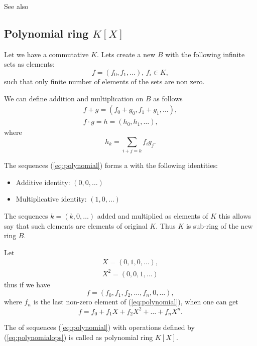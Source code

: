 \begin{appendices}
\begin{definition}
  See also 
  \label{def:quotientring}
\end{definition}

\subsection{Polynomial ring $K\left[X\right]$}

Let we have a commutative  $K$. Lets create a new
 $B$ with the following infinite sets as elements:
\begin{equation}
  f = \left(f_0, f_1, \dots \right), \, f_i \in K,
  \label{eq:polynomial}
\end{equation}
such that only finite number of elements of the sets are non zero.

We can define addition and multiplication on $B$ as follows
\begin{eqnarray}
  f + g = \left(f_0 + g_0, f_1 + g_1, \dots \right),
  \nonumber \\
  f \cdot g = h = \left(h_0, h_1, \dots \right),
  \label{eq:polynomialops}
\end{eqnarray}
where
\[
h_k = \sum_{i + j =k} f_i g_j. 
\]

The sequences (\ref{eq:polynomial}) forms a  with
the following identities:
\begin{itemize}
\item Additive identity: $\left(0, 0, \dots \right)$
\item Multiplicative identity: $\left(1, 0, \dots \right)$
\end{itemize}

The
sequences $k = \left(k, 0, \dots \right)$ added and multiplied as
elements of $K$ this allows say that such elements are elements of
original  $K$. Thus $K$ is sub-ring of the new ring
$B$.

Let
\begin{eqnarray}
  X = \left(0, 1, 0, \dots \right),
  \nonumber \\
  X^2 = \left(0, 0, 1, \dots \right)
  \nonumber
\end{eqnarray}
thus if we have
\[
f = \left(f_0, f_1, f_2, \dots, f_n, 0, \dots \right),
\]
where $f_n$ is the last non-zero element of (\ref{eq:polynomial}),
when one can get
\[
f = f_0 + f_1 X + f_2 X^2 + \dots + f_n X^n.
\]

\begin{definition}
  The  of sequences (\ref{eq:polynomial}) with
  operations defined by (\ref{eq:polynomialops}) is called as
  polynomial ring $K\left[X\right]$.
  \label{def:polynomial}
\end{definition}


\end{appendices}
